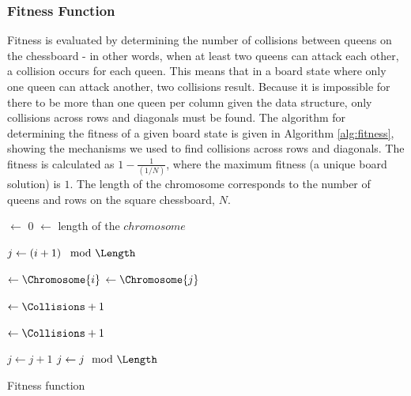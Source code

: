 \documentclass{sig-alternate}
\begin{document}
\subsubsection{Fitness Function}
Fitness is evaluated by determining the number of collisions between queens on the chessboard - in other words, when at least two queens can attack each other, a collision occurs for each queen. This means that in a board state where only one queen can attack another, two collisions result. Because it is impossible for there to be more than one queen per column given the data structure, only collisions across rows and diagonals must be found. The algorithm for determining the fitness of a given board state is given in Algorithm \ref{alg:fitness}, showing the mechanisms we used to find collisions across rows and diagonals. The fitness is calculated as $1 - \frac{1}{(1/N)}$, where the maximum fitness (a unique board solution) is $1$. The length of the chromosome corresponds to the number of queens and rows on the square chessboard, $N$.
 

\begin{algorithm}[t!]
  \SetAlgoLined
  \DontPrintSemicolon
  
  {
    \BlankLine
    
    \Collisions $\leftarrow$ 0\;
    \Length $\leftarrow$ length of the $chromosome$\;
    \BlankLine
    
    {
      $j \leftarrow \left( i + 1 \right) \mod{\Length}$\;
      {
        \Yi $\leftarrow \Chromosome{i}$\;
        \Yj $\leftarrow \Chromosome{j}$\;
        \BlankLine
        
        \If{\Yi == \Yj}
        {
          \Collisions $\leftarrow \Collisions + 1$\; 
        }
        \BlankLine
        
        {
          \Collisions $\leftarrow \Collisions + 1$\;
        }
        \BlankLine
        
        $j \leftarrow j + 1$\;
        $j \leftarrow j \mod{\Length}$\;
      }
    }
    \BlankLine

    {
      \;
    }
    {
      \;
    }
  }
\caption{Fitness function}
\label{alg:fitness}
\end{algorithm}
\end{document}
